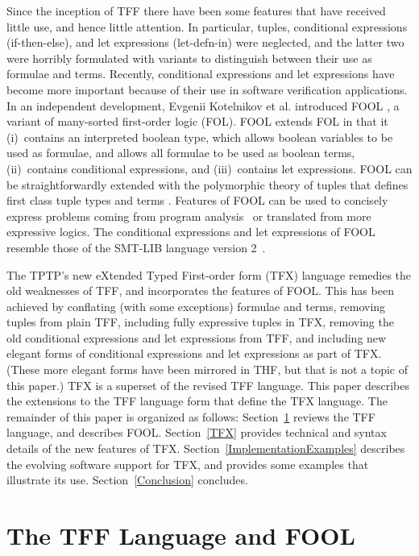 \documentclass{easychair}
\begin{document}
Since the inception of TFF there have been some features that have 
received little use, and hence little attention. 
In particular, tuples, conditional expressions (if-then-else), and let 
expressions (let-defn-in) were neglected, and the latter two were horribly 
formulated with variants to distinguish between their use as formulae and 
terms. 
Recently, conditional expressions and let expressions have become more 
important because of their use in software verification applications.
In an independent development, Evgenii Kotelnikov et al. introduced FOOL
\cite{KKV15}, a variant of many-sorted first-order logic (FOL).
FOOL extends FOL in that it (i)~contains an interpreted boolean type, which
allows boolean variables to be used as formulae, and allows all formulae to be 
used as boolean terms, (ii)~contains conditional expressions, and 
(iii)~contains let expressions.
FOOL can be straightforwardly extended with the polymorphic theory of tuples 
that defines first class tuple types and terms \cite{KKV18}.
Features of FOOL can be used to concisely express problems coming from program
analysis~\cite{KKV18} or translated from more expressive logics. 
The conditional expressions and let expressions of FOOL resemble those of the 
SMT-LIB language version 2~\cite{BST10}.

The TPTP's new eXtended Typed First-order form (TFX) language remedies the
old weaknesses of TFF, and incorporates the features of FOOL.
This has been achieved by conflating (with some exceptions) formulae and 
terms, removing tuples from plain TFF, including fully expressive tuples in 
TFX, removing the old conditional expressions and let expressions from 
TFF, and including new elegant forms of conditional expressions and let 
expressions as part of TFX. 
(These more elegant forms have been mirrored in THF, but that is not a topic of
this paper.)
TFX is a superset of the revised TFF language. 
This paper describes the extensions to the TFF language form that define the 
TFX language.
The remainder of this paper is organized as follows:
Section~\ref{TPTPFOOL} reviews the TFF language, and describes FOOL.
Section~\ref{TFX} provides technical and syntax details of the new features 
of TFX.
Section~\ref{ImplementationExamples} describes the evolving software 
support for TFX, and provides some examples that illustrate its use.
Section~\ref{Conclusion} concludes.

\section{The TFF Language and FOOL}
\label{TPTPFOOL}
\end{document}
